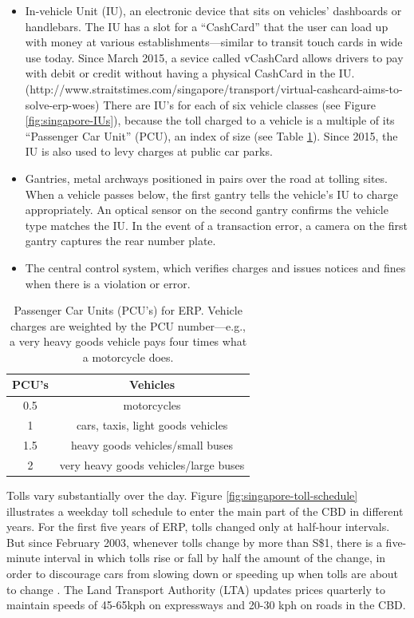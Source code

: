 \begin{itemize}
\item In-vehicle Unit (IU), an electronic device that sits on vehicles' dashboards or handlebars. The IU has a slot for a ``CashCard'' that the user can load up with money at various establishments---similar to transit touch cards in wide use today. Since March 2015, a sevice called vCashCard allows drivers to pay with debit or credit without having a physical CashCard in the IU. (http://www.straitstimes.com/singapore/transport/virtual-cashcard-aims-to-solve-erp-woes) There are IU's for each of six vehicle classes (see Figure \ref{fig:singapore-IUs}), because the toll charged to a vehicle is a multiple of its ``Passenger Car Unit'' (PCU), an index of size (see Table \ref{tab:passenger-car-units}). Since 2015, the IU is also used to levy charges at public car parks.

\item Gantries, metal archways positioned in pairs over the road at tolling sites. When a vehicle passes below, the first gantry tells the vehicle's IU to charge appropriately. An optical sensor on the second gantry confirms the vehicle type matches the IU. In the event of a transaction error, a camera on the first gantry captures the rear number plate. 

\item The central control system, which verifies charges and issues notices and fines when there is a violation or error.
\end{itemize}

\begin{table}
	\begin{tabular}{|c|c|}
		\hline 
		PCU's & Vehicles\tabularnewline                              
		\hline 
		\hline 
		0.5   & motorcycles\tabularnewline                           
		\hline 
		1     & cars, taxis, light goods vehicles\tabularnewline     
		\hline 
		1.5   & heavy goods vehicles/small buses\tabularnewline      
		\hline 
		2     & very heavy goods vehicles/large buses\tabularnewline 
		\hline 
	\end{tabular}
	
	\caption{
	Passenger Car Units (PCU's) for ERP. Vehicle charges are weighted by the PCU number---e.g., a very heavy goods vehicle pays four times what a motorcycle does. \citep{LTA2016} 
	}
	\label{tab:passenger-car-units}
\end{table}

Tolls vary substantially over the day. Figure \ref{fig:singapore-toll-schedule} illustrates a weekday toll schedule to enter the main part of the CBD in different years. For the first five years of ERP, tolls changed only at half-hour intervals. But since February 2003, whenever tolls change by more than S\$1, there is a five-minute interval in which tolls rise or fall by half the amount of the change, in order to discourage cars from slowing down or speeding up when tolls are about to change \citep{Menon2004}. The Land Transport Authority (LTA) updates prices quarterly to maintain speeds of 45-65kph on expressways and 20-30 kph on roads in the CBD.
	
